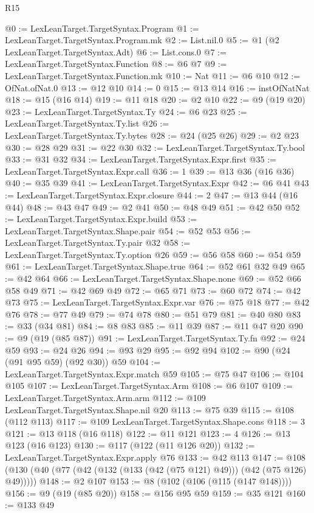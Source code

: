 \begin{lexlean}{R15}
\begin{coremodule}
@0 := LexLeanTarget.TargetSyntax.Program
@1 := LexLeanTarget.TargetSyntax.Program.mk
@2 := List.nil.{0}
@5 := @1 (@2 LexLeanTarget.TargetSyntax.Adt)
@6 := List.cons.{0}
@7 := LexLeanTarget.TargetSyntax.Function
@8 := @6 @7
@9 := LexLeanTarget.TargetSyntax.Function.mk
@10 := Nat
@11 := @6 @10
@12 := OfNat.ofNat.{0}
@13 := @12 @10
@14 := 0
@15 := @13 @14
@16 := instOfNatNat
@18 := @15 (@16 @14)
@19 := @11 @18
@20 := @2 @10
@22 := @9 (@19 @20)
@23 := LexLeanTarget.TargetSyntax.Ty
@24 := @6 @23
@25 := LexLeanTarget.TargetSyntax.Ty.list
@26 := LexLeanTarget.TargetSyntax.Ty.bytes
@28 := @24 (@25 @26)
@29 := @2 @23
@30 := @28 @29
@31 := @22 @30
@32 := LexLeanTarget.TargetSyntax.Ty.bool
@33 := @31 @32
@34 := LexLeanTarget.TargetSyntax.Expr.first
@35 := LexLeanTarget.TargetSyntax.Expr.call
@36 := 1
@39 := @13 @36 (@16 @36)
@40 := @35 @39
@41 := LexLeanTarget.TargetSyntax.Expr
@42 := @6 @41
@43 := LexLeanTarget.TargetSyntax.Expr.closure
@44 := 2
@47 := @13 @44 (@16 @44)
@48 := @43 @47
@49 := @2 @41
@50 := @48 @49
@51 := @42 @50
@52 := LexLeanTarget.TargetSyntax.Expr.build
@53 := LexLeanTarget.TargetSyntax.Shape.pair
@54 := @52 @53
@56 := LexLeanTarget.TargetSyntax.Ty.pair @32
@58 := LexLeanTarget.TargetSyntax.Ty.option @26
@59 := @56 @58
@60 := @54 @59
@61 := LexLeanTarget.TargetSyntax.Shape.true
@64 := @52 @61 @32 @49
@65 := @42 @64
@66 := LexLeanTarget.TargetSyntax.Shape.none
@69 := @52 @66 @58 @49
@71 := @42 @69 @49
@72 := @65 @71
@73 := @60 @72
@74 := @42 @73
@75 := LexLeanTarget.TargetSyntax.Expr.var
@76 := @75 @18
@77 := @42 @76
@78 := @77 @49
@79 := @74 @78
@80 := @51 @79
@81 := @40 @80
@83 := @33 (@34 @81)
@84 := @8 @83
@85 := @11 @39
@87 := @11 @47 @20
@90 := @9 (@19 (@85 @87))
@91 := LexLeanTarget.TargetSyntax.Ty.fn
@92 := @24 @59
@93 := @24 @26
@94 := @93 @29
@95 := @92 @94
@102 := @90 (@24 (@91 @95 @59) (@92 @30)) @59
@104 := LexLeanTarget.TargetSyntax.Expr.match @59
@105 := @75 @47
@106 := @104 @105
@107 := LexLeanTarget.TargetSyntax.Arm
@108 := @6 @107
@109 := LexLeanTarget.TargetSyntax.Arm.arm
@112 := @109 LexLeanTarget.TargetSyntax.Shape.nil @20
@113 := @75 @39
@115 := @108 (@112 @113)
@117 := @109 LexLeanTarget.TargetSyntax.Shape.cons
@118 := 3
@121 := @13 @118 (@16 @118)
@122 := @11 @121
@123 := 4
@126 := @13 @123 (@16 @123)
@130 := @117 (@122 (@11 @126 @20))
@132 := LexLeanTarget.TargetSyntax.Expr.apply @76
@133 := @42 @113
@147 := @108 (@130 (@40 (@77 (@42 (@132 (@133 (@42 (@75 @121) @49))) (@42 (@75 @126) @49)))))
@148 := @2 @107
@153 := @8 (@102 (@106 (@115 (@147 @148))))
@156 := @9 (@19 (@85 @20))
@158 := @156 @95 @59
@159 := @35 @121
@160 := @133 @49

\end{coremodule}
\end{lexlean}
